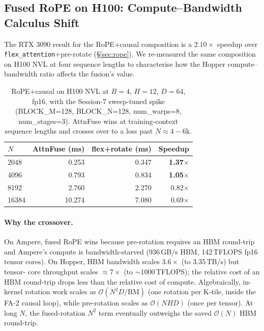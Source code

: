 
\subsection{Fused RoPE on H100: Compute--Bandwidth Calculus Shift}
\label{sec:hopper_rope}

The RTX 3090 result for the RoPE+causal composition is a $2.10\times$
speedup over \texttt{flex\_attention}+pre-rotate (\S\ref{sec:rope}).
We re-measured the same composition on H100 NVL at four sequence
lengths to characterise how the Hopper compute--bandwidth ratio
affects the fusion's value.

\begin{table}[h]
\centering
\small
\begin{tabular}{lrrr}
\toprule
$N$ & AttnFuse (ms) & flex+rotate (ms) & Speedup \\
\midrule
2048   & 0.253  & 0.347  & \textbf{1.37$\times$} \\
4096   & 0.793  & 0.834  & \textbf{1.05$\times$} \\
8192   & 2.760  & 2.270  & 0.82$\times$ \\
16384  & 10.274 & 7.080  & 0.69$\times$ \\
\bottomrule
\end{tabular}
\caption{RoPE+causal on H100 NVL at $B{=}4$, $H{=}12$, $D{=}64$, fp16,
with the Session-7 sweep-tuned spike (BLOCK\_M=128, BLOCK\_N=128,
num\_warps=8, num\_stages=3). AttnFuse wins at training-context
sequence lengths and crosses over to a loss past $N \approx 4{-}6\text{k}$.}
\label{tab:hopper_rope}
\end{table}

\paragraph{Why the crossover.} On Ampere, fused RoPE wins because
pre-rotation requires an HBM round-trip and Ampere's compute is
bandwidth-starved (936\,GB/s HBM, 142\,TFLOPS fp16 tensor cores). On
Hopper, HBM bandwidth scales $3.6\times$ (to 3.35\,TB/s) but tensor-
core throughput scales $\approx 7\times$ (to $\sim$1000\,TFLOPS); the
relative cost of an HBM round-trip drops less than the relative cost
of compute. Algebraically, in-kernel rotation work scales as
$\mathcal{O}(N^2 D / \text{BM})$ (one rotation per K-tile, inside the
FA-2 causal loop), while pre-rotation scales as $\mathcal{O}(NHD)$
(once per tensor). At long $N$, the fused-rotation $N^2$ term
eventually outweighs the saved $\mathcal{O}(N)$ HBM round-trip.


